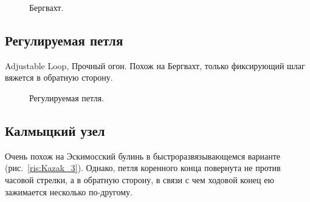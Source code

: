 \begin{figure}[H]\centering
\end{figure}

\begin{figure}[H]\centering
\end{figure}

\begin{figure}[H]\centering
	\subfloat[Результат]{\label{ris:Bergvaht_3}
	\tcbox[enhanced jigsaw,colframe=black,opacityframe=0.5,opacityback=0.5]
		{\centering
			}
		}
	\caption{Бергвахт.}\label{ris:Bergvaht}
\end{figure}

\subsection{Регулируемая петля}

Adjustable Loop, Прочный огон. Похож на Бергвахт, только фиксирующий шлаг вяжется в обратную сторону.

\begin{figure}[H]\centering
	\begin{minipage}{1\linewidth}
		\begin{center}
			\tcbox[enhanced jigsaw,colframe=black,opacityframe=0.5,opacityback=0.5]
			{\centering{}}
		\end{center}
	\end{minipage}
\caption{Регулируемая петля.}
\label{ris:Reguliruemaya}
\end{figure}

\subsection{Калмыцкий узел}

Очень похож на Эскимосский булинь в быстроразвязывающемся варианте (рис.~\ref{ris:Kazak_3}). Однако, петля коренного конца повернута не против часовой стрелки, а в обратную сторону, в связи с чем ходовой конец ею зажимается несколько по-другому.

